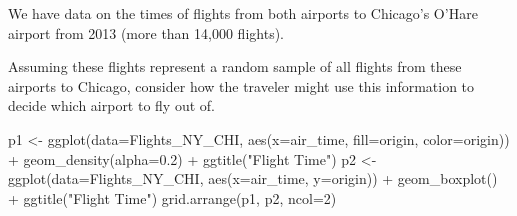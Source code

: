 \documentclass[
  letterpaper,
  DIV=11,
  numbers=noendperiod]{scrreprt}
\newenvironment{Shaded}{\begin{snugshade}}{\end{snugshade}}
\newcommand{\AttributeTok}[1]{\textcolor[rgb]{0.40,0.45,0.13}{#1}}
\newcommand{\DecValTok}[1]{\textcolor[rgb]{0.68,0.00,0.00}{#1}}
\newcommand{\FloatTok}[1]{\textcolor[rgb]{0.68,0.00,0.00}{#1}}
\newcommand{\FunctionTok}[1]{\textcolor[rgb]{0.28,0.35,0.67}{#1}}
\newcommand{\NormalTok}[1]{\textcolor[rgb]{0.00,0.23,0.31}{#1}}
\newcommand{\OtherTok}[1]{\textcolor[rgb]{0.00,0.23,0.31}{#1}}
\newcommand{\SpecialCharTok}[1]{\textcolor[rgb]{0.37,0.37,0.37}{#1}}
\newcommand{\StringTok}[1]{\textcolor[rgb]{0.13,0.47,0.30}{#1}}
\begin{document}
We have data on the times of flights from both airports to Chicago's
O'Hare airport from 2013 (more than 14,000 flights).

Assuming these flights represent a random sample of all flights from
these airports to Chicago, consider how the traveler might use this
information to decide which airport to fly out of.

\begin{Shaded}
\end{Shaded}

\begin{Shaded}
\begin{Highlighting}[]
\NormalTok{p1 }\OtherTok{\textless{}{-}} \FunctionTok{ggplot}\NormalTok{(}\AttributeTok{data=}\NormalTok{Flights\_NY\_CHI, }\FunctionTok{aes}\NormalTok{(}\AttributeTok{x=}\NormalTok{air\_time, }\AttributeTok{fill=}\NormalTok{origin, }\AttributeTok{color=}\NormalTok{origin)) }\SpecialCharTok{+} \FunctionTok{geom\_density}\NormalTok{(}\AttributeTok{alpha=}\FloatTok{0.2}\NormalTok{) }\SpecialCharTok{+} \FunctionTok{ggtitle}\NormalTok{(}\StringTok{"Flight Time"}\NormalTok{)}
\NormalTok{p2 }\OtherTok{\textless{}{-}} \FunctionTok{ggplot}\NormalTok{(}\AttributeTok{data=}\NormalTok{Flights\_NY\_CHI, }\FunctionTok{aes}\NormalTok{(}\AttributeTok{x=}\NormalTok{air\_time, }\AttributeTok{y=}\NormalTok{origin)) }\SpecialCharTok{+} \FunctionTok{geom\_boxplot}\NormalTok{() }\SpecialCharTok{+} \FunctionTok{ggtitle}\NormalTok{(}\StringTok{"Flight Time"}\NormalTok{)}
\FunctionTok{grid.arrange}\NormalTok{(p1, p2, }\AttributeTok{ncol=}\DecValTok{2}\NormalTok{)}
\end{Highlighting}
\end{Shaded}
\end{document}
